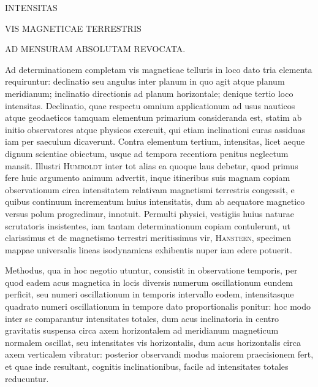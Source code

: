 \renewcommand{\Article}[1]{\par\medskip\Needspace{4\baselineskip}\pdfbookmark[1]{Art. #1}{magnetism-art-#1}\centerline{\textbf{#1.}}\nobreak\smallskip}
\par\medskip
\centerline{INTENSITAS}
\centerline{VIS MAGNETICAE TERRESTRIS}
\centerline{AD MENSURAM ABSOLUTAM REVOCATA.}
\medskip
Ad determinationem completam vis magneticae telluris in loco dato tria elementa requiruntur: declinatio seu angulus inter planum in quo agit atque planum meridianum; inclinatio directionis ad planum horizontale; denique tertio loco intensitas. Declinatio, quae respectu omnium applicationum ad usus nauticos atque geodaeticos tamquam elementum primarium consideranda est, statim ab initio observatores atque physicos exercuit, qui etiam inclinationi curas assiduas iam per saeculum dicaverunt. Contra elementum tertium, intensitas, licet aeque dignum scientiae obiectum, usque ad tempora recentiora penitus neglectum mansit. Illustri \textsc{Humboldt} inter tot alias ea quoque laus debetur, quod primus fere huic argumento animum advertit, inque itineribus suis magnam copiam observationum circa intensitatem relativam magnetismi terrestris congessit, e quibus continuum incrementum huius intensitatis, dum ab aequatore magnetico versus polum progredimur, innotuit. Permulti physici, vestigiis huius naturae scrutatoris insistentes, iam tantam determinationum copiam contulerunt, ut clarissimus et de magnetismo terrestri meritissimus vir, \textsc{Hansteen}, specimen mappae universalis lineas isodynamicas exhibentis nuper iam edere potuerit.

Methodus, qua in hoc negotio utuntur, consistit in observatione temporis, per quod eadem acus magnetica in locis diversis numerum oscillationum eundem perficit, seu numeri oscillationum in temporis intervallo eodem, intensitasque quadrato numeri oscillationum in tempore dato proportionalis ponitur: hoc modo inter se comparantur intensitates totales, dum acus inclinatoria in centro gravitatis suspensa circa axem horizontalem ad meridianum magneticum normalem oscillat, seu intensitates vis horizontalis, dum acus horizontalis circa axem verticalem vibratur: posterior observandi modus maiorem praecisionem fert, et quae inde resultant, cognitis inclinationibus, facile ad intensitates totales reducuntur.

